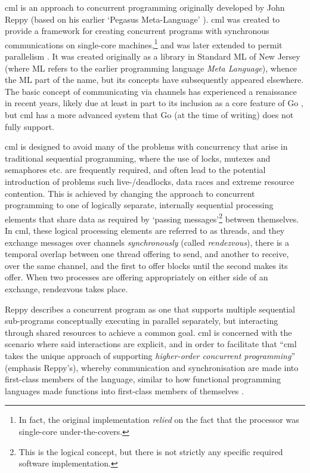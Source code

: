 \Gls{cml} \cite{Reppy1991,Panangaden1997} is an approach to concurrent programming originally developed by John Reppy (based on his earlier `Pegasus Meta-Language' \cite{Reppy1988}).  \Gls{cml} was created to provide a framework for creating concurrent programs with synchronous communications on single-core machines,\footnote{In fact, the original implementation \emph{relied} on the fact that the processor was single-core under-the-covers.} and was later extended to permit parallelism \cite{Reppy2009a}.  It was created originally as a library in Standard ML of New Jersey (where ML refers to the earlier programming language \textit{Meta Language}), whence the ML part of the name, but its concepts have subsequently appeared elsewhere.  The basic concept of communicating via channels has experienced a renaissance in recent years, likely due at least in part to its inclusion as a core feature of Go \cite{Meyerson2014}, but \gls{cml} has a more advanced system that Go (at the time of writing) does not fully support.

\Gls{cml} is designed to avoid many of the problems with concurrency that arise in traditional sequential programming, where the use of locks, mutexes and semaphores etc. are frequently required, and often lead to the potential introduction of problems such live-/deadlocks, data races and extreme resource contention.  This is achieved by changing the approach to concurrent programming to one of logically separate, internally sequential processing elements that share data as required by `passing messages'\footnote{This is the logical concept, but there is not strictly any specific required software implementation.} between themselves.  In \gls{cml}, these logical processing elements are referred to as threads, and they exchange messages over channels \emph{synchronously} (called \emph{rendezvous}), \ie{} there is a temporal overlap between one thread offering to send, and another to receive, over the same channel, and the first to offer blocks until the second makes its offer.  When two processes are offering appropriately on either side of an exchange, rendezvous takes place.

Reppy describes a concurrent program as one that supports multiple sequential sub-programs conceptually executing in parallel separately, but interacting through shared resources to achieve a common goal.  \Gls{cml} is concerned with the scenario where said interactions are explicit, and in order to facilitate that \enquote{\gls{cml} takes the unique approach of supporting \emph{higher-order concurrent programming}} (emphasis Reppy's), whereby communication and synchronisation are made into first-class members of the language, similar to how functional programming languages made functions into first-class members of themselves \cite[Preface]{Reppy2007}.